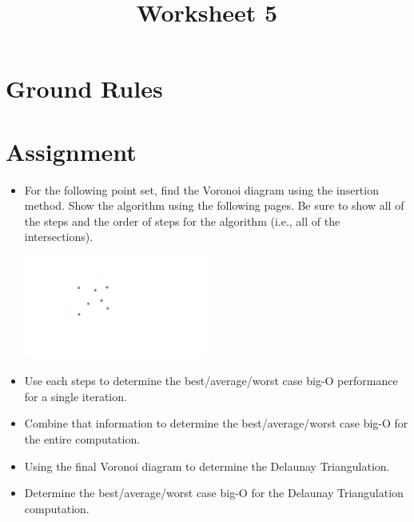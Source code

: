 \documentclass[a4paper,12pt]{article}
\title{Worksheet 5}
\begin{document}
\maketitle


\vspace{5pt}
\section{Ground Rules}


\vspace{5pt}
\section{Assignment}

\begin{itemize}
\item For the following point set, find the Voronoi diagram using the insertion method. Show the algorithm using the following pages. Be sure to show all of the steps and the order of steps for the algorithm (i.e., all of the intersections).

\begin{center}
\includegraphics[width=6cm]{../images/voronoi7.pdf}
\end{center}


\item Use each steps to determine the best/average/worst case big-O performance for a single iteration. 
\item Combine that information to determine the best/average/worst case big-O for the entire computation.

\item Using the final Voronoi diagram to determine the Delaunay Triangulation. 

\item Determine the best/average/worst case big-O for the Delaunay Triangulation computation.


\end{itemize}
\end{document}
